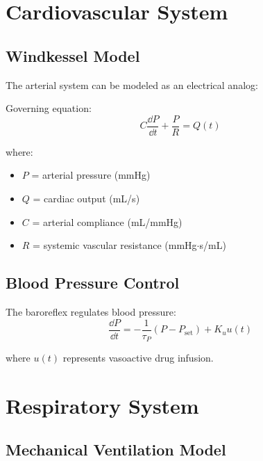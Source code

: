 \section{Cardiovascular System}
\label{sec:cardiovascular}

\subsection{Windkessel Model}

The arterial system can be modeled as an electrical analog:



Governing equation:
\begin{equation}
C\frac{\dd P}{\dd t} + \frac{P}{R} = Q(t)
\end{equation}

where:
\begin{itemize}
    \item $P$ = arterial pressure (mmHg)
    \item $Q$ = cardiac output (mL/s)
    \item $C$ = arterial compliance (mL/mmHg)
    \item $R$ = systemic vascular resistance (mmHg$\cdot$s/mL)
\end{itemize}

\subsection{Blood Pressure Control}

The baroreflex regulates blood pressure:
\begin{equation}
\frac{\dd P}{\dd t} = -\frac{1}{\tau_P}(P - P_{\text{set}}) + K_u u(t)
\end{equation}

where $u(t)$ represents vasoactive drug infusion.

\section{Respiratory System}
\label{sec:respiratory}

\subsection{Mechanical Ventilation Model}

